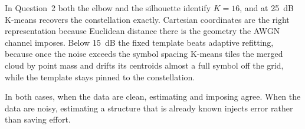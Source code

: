 \documentclass[11pt,a4paper]{article}
\begin{document}
In Question~2 both the elbow and the silhouette identify $K=16$, and at 25~dB K-means recovers
the constellation exactly. Cartesian coordinates are the right representation because Euclidean
distance there is the geometry the AWGN channel imposes. Below 15~dB the fixed template beats
adaptive refitting, because once the noise exceeds the symbol spacing K-means tiles the merged
cloud by point mass and drifts its centroids almost a full symbol off the grid, while the
template stays pinned to the constellation.

In both cases, when the data are clean, estimating and imposing agree. When the data are noisy,
estimating a structure that is already known injects error rather than saving effort.
\end{document}
